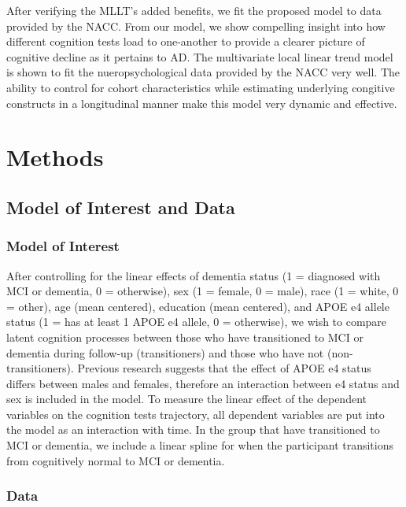 \documentclass[
]{article}
\begin{document}
After verifying the MLLT's added benefits, we fit the proposed model to data provided by the NACC. From our model, we show compelling insight into how different cognition tests load to one-another to provide a clearer picture of cognitive decline as it pertains to AD. The multivariate local linear trend model is shown to fit the nueropsychological data provided by the NACC very well. The ability to control for cohort characteristics while estimating underlying congitive constructs in a longitudinal manner make this model very dynamic and effective.

\hypertarget{methods}{%
\section{Methods}\label{methods}}

\hypertarget{model-of-interest-and-data}{%
\subsection{Model of Interest and Data}\label{model-of-interest-and-data}}

\hypertarget{MOI}{%
\subsubsection{Model of Interest}\label{MOI}}

After controlling for the linear effects of dementia status (1 = diagnosed with MCI or dementia, 0 = otherwise), sex (1 = female, 0 = male), race (1 = white, 0 = other), age (mean centered), education (mean centered), and APOE e4 allele status (1 = has at least 1 APOE e4 allele, 0 = otherwise), we wish to compare latent cognition processes between those who have transitioned to MCI or dementia during follow-up (transitioners) and those who have not (non-transitioners). Previous research suggests that the effect of APOE e4 status differs between males and females, therefore an interaction between e4 status and sex is included in the model. To measure the linear effect of the dependent variables on the cognition tests trajectory, all dependent variables are put into the model as an interaction with time. In the group that have transitioned to MCI or dementia, we include a linear spline for when the participant transitions from cognitively normal to MCI or dementia.

\hypertarget{DAT}{%
\subsubsection{Data}\label{DAT}}
\end{document}

